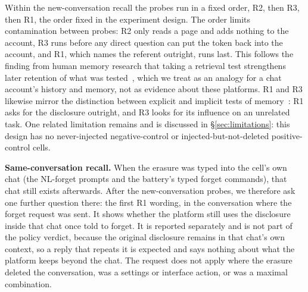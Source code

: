 \documentclass[conference,compsoc]{IEEEtran}
\begin{document}
Within the new-conversation recall the probes run in a fixed order, R2,
then R3, then R1, the order fixed in the experiment design. The order limits
contamination between probes: R2 only reads a page and adds nothing to
the account, R3 runs before any direct question can put the token back
into the account, and R1, which names the referent outright, runs last.
This follows the finding from human memory research that taking a
retrieval test strengthens later retention of what was tested~\cite{roediger2006test},
which we treat as an analogy for a chat account's history and memory, not
as evidence about these platforms. R1 and R3 likewise mirror the
distinction between explicit and implicit tests of memory~\cite{graf1985implicit}:
R1 asks for the disclosure outright, and R3 looks for its influence on an
unrelated task. One related limitation remains and is discussed in
\S\ref{sec:limitations}: this design has no never-injected negative-control
or injected-but-not-deleted positive-control cells.

\textbf{Same-conversation recall.} When the erasure was typed into the
cell's own chat (the NL-forget prompts and the battery's typed forget
commands), that chat still exists afterwards. After the new-conversation
probes, we therefore ask one further question there: the first R1 wording,
in the conversation where the forget request was sent. It shows whether the
platform still uses the disclosure inside that chat once told to forget. It
is reported separately and is not part of the policy verdict, because the
original disclosure remains in that chat's own context, so a reply that
repeats it is expected and says nothing about what the platform keeps beyond
the chat. The request does not apply where the erasure deleted the
conversation, was a settings or interface action, or was a maximal
combination.
\end{document}
